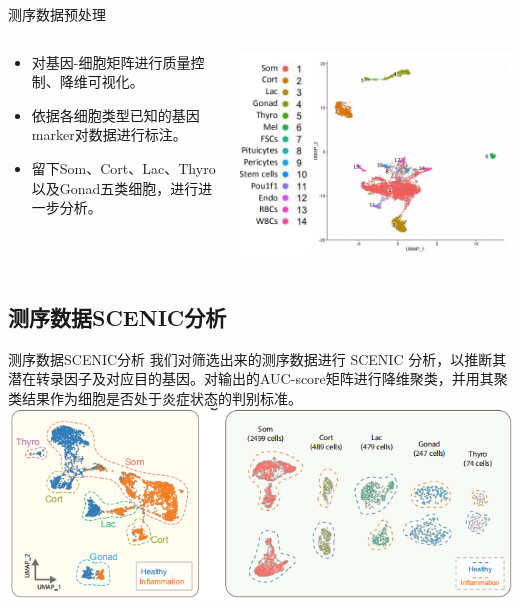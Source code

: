 \documentclass{beamer}
\begin{document}
\begin{frame}{测序数据预处理}
  \begin{columns}
    \begin{column}{.5\linewidth}
      \begin{itemize}
        \item 对基因-细胞矩阵进行质量控制、降维可视化。
        \item 依据各细胞类型已知的基因marker对数据进行标注。
        \item 留下Som、Cort、Lac、Thyro以及Gonad五类细胞，进行进一步分析。
      \end{itemize}
    \end{column}

    \begin{column}{.5\linewidth}
      \includegraphics[width=\linewidth]{figs/expr-res1.png}
    \end{column}
  \end{columns}
\end{frame}

\subsection{测序数据SCENIC分析}

\begin{frame}{测序数据SCENIC分析}
  我们对筛选出来的测序数据进行 SCENIC 分析，以推断其潜在转录因子及对应目的基因。对输出的AUC-score矩阵进行降维聚类，并用其聚类结果作为细胞是否处于炎症状态的判别标准。
  \center
  \includegraphics[width=0.8\linewidth]{figs/expr-res2.png}
\end{frame}
\end{document}
